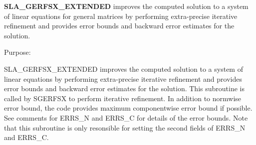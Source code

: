 {\bfseries S\+L\+A\+\_\+\+G\+E\+R\+F\+S\+X\+\_\+\+E\+X\+T\+E\+N\+D\+E\+D} improves the computed solution to a system of linear equations for general matrices by performing extra-\/precise iterative refinement and provides error bounds and backward error estimates for the solution. 

 \begin{DoxyParagraph}{Purpose\+: }
\begin{DoxyVerb} SLA_GERFSX_EXTENDED improves the computed solution to a system of
 linear equations by performing extra-precise iterative refinement
 and provides error bounds and backward error estimates for the solution.
 This subroutine is called by SGERFSX to perform iterative refinement.
 In addition to normwise error bound, the code provides maximum
 componentwise error bound if possible. See comments for ERRS_N
 and ERRS_C for details of the error bounds. Note that this
 subroutine is only resonsible for setting the second fields of
 ERRS_N and ERRS_C.\end{DoxyVerb}
 
\end{DoxyParagraph}

